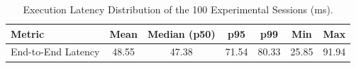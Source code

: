 \begin{table}[!htbp]
\renewcommand{\arraystretch}{1.05}
\centering
\small
\caption{Execution Latency Distribution of the 100 Experimental Sessions (ms).}
\label{tab:session_latency}
\vspace{4pt}
\begin{tabular}{l c c c c c c}
\hline
Metric & Mean & Median (p50) & p95 & p99 & Min & Max \\
\hline
End-to-End Latency & 48.55 & 47.38 & 71.54 & 80.33 & 25.85 & 91.94 \\
\hline
\end{tabular}
\end{table}
